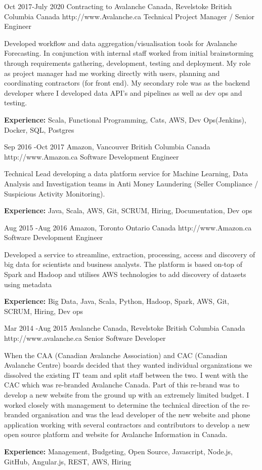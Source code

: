 \documentclass{article}
\begin{document}
\begin{job}
{Oct 2017-}{July 2020}
{Contracting to Avalanche Canada, Revelstoke British Columbia Canada}
{http://www.Avalanche.ca}
{Technical Project Manager / Senior Engineer}%
{Developed workflow and data aggregation/visualisation tools for Avalanche Forecasting. In conjunction with internal staff worked from initial brainstorming through requirements gathering, development, testing and deployment. My role as project manager had me working directly with users, planning and coordinating contractors (for front end). My secondary role was as the backend developer where I developed data API's and pipelines as well as dev ops and testing.\\
\rule{0mm}{5mm}\textbf{Experience:} Scala, Functional Programming, Cats, AWS, Dev Ops(Jenkins), Docker, SQL, Postgres}
\end{job}

\begin{job}
{Sep 2016 -}{Oct 2017}
{Amazon, Vancouver British Columbia Canada}
{http://www.Amazon.ca}
{Software Development Engineer}%
{Technical Lead developing a data platform service for Machine Learning, Data Analysis and Investigation teams in Anti Money Laundering (Seller Compliance / Suspicious Activity Monitoring). \\
\rule{0mm}{5mm}\textbf{Experience:} Java, Scala, AWS, Git, SCRUM, Hiring, Documentation, Dev ops}
\end{job}


\begin{job}
{Aug 2015 -}{Aug 2016}
{Amazon, Toronto Ontario Canada}
{http://www.Amazon.ca}
{Software Development Engineer}%
{Developed a service to streamline, extraction, processing, access and discovery of big data for scientists and business analysts. The platform is based on-top of Spark and Hadoop and utilises AWS technologies to add discovery of datasets using metadata \\
\rule{0mm}{5mm}\textbf{Experience:} Big Data, Java, Scala, Python, Hadoop, Spark, AWS, Git, SCRUM, Hiring, Dev ops}
\end{job}

\begin{job}
{Mar 2014 -}{Aug 2015}
{Avalanche Canada, Revelstoke British Columbia Canada}
{http://www.avalanche.ca}
{Senior Software Developer}%
{When the CAA (Canadian Avalanche Association) and CAC (Canadian Avalanche Centre) boards decided that they wanted individual organizations we dissolved the existing IT team and split staff between the two. I went with the CAC which was re-branded Avalanche Canada. Part of this re-brand was to develop a new website from the ground up with an extremely limited budget. I worked closely with management to determine the technical direction of the re-branded organisation and was the lead developer of the new website and phone application working with several contractors and contributors to develop a new open source platform and website for Avalanche Information in Canada. \\
\rule{0mm}{5mm}\textbf{Experience:} Management, Budgeting, Open Source, Javascript, Node.js, GitHub, Angular.js, REST, AWS, Hiring }
\end{job}
\end{document}
